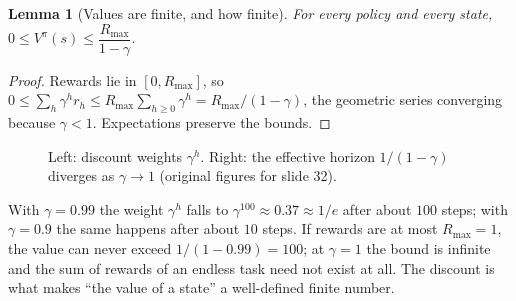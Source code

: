 \documentclass[11pt,a4paper]{article}
\newcommand{\Rmax}{R_{\max}}
\theoremstyle{plain}
\newtheorem{lemma}[theorem]{Lemma}
\theoremstyle{definition}
\theoremstyle{remark}
\begin{document}
\begin{lemma}[Values are finite, and how finite]\label{lem:bound}
For every policy and every state, $0\le V^\pi(s)\le\dfrac{\Rmax}{1-\gamma}$.
\end{lemma}
\begin{proof}
Rewards lie in $[0,\Rmax]$, so $0\le\sum_h\gamma^hr_h\le\Rmax\sum_{h\ge0}\gamma^h=\Rmax/(1-\gamma)$, the geometric series converging because $\gamma<1$. Expectations preserve the bounds.
\end{proof}

\begin{figure}[htbp]
\centering
{}
\hfill
{}
\caption{Left: discount weights $\gamma^h$. Right: the effective horizon $1/(1-\gamma)$ diverges as $\gamma\to1$ (original figures for slide 32).}
\end{figure}

\begin{intuition}
With $\gamma=0.99$ the weight $\gamma^{h}$ falls to $\gamma^{100}\approx0.37\approx1/e$ after about $100$ steps; with $\gamma=0.9$ the same happens after about $10$ steps. If rewards are at most $\Rmax=1$, the value can never exceed $1/(1-0.99)=100$; at $\gamma=1$ the bound is infinite and the sum of rewards of an endless task need not exist at all. The discount is what makes ``the value of a state'' a well-defined finite number.
\end{intuition}

\end{document}
